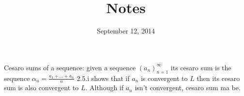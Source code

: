 \documentclass[letterpaper]{article}
\begin{document}
\title{Notes}
\date{September 12, 2014}
\maketitle
Cesaro sums of a sequence: given a sequence $(a_n)_{n=1}^\infty$ its cesaro sum is the sequence $\alpha_n=\frac{a_1+\dots+a_n}{n}$ 2.5.i shows that if $a_n$ is convergent to $L$ then its cesaro sum is also convergent to $L$. Although if $a_n$ isn't convergent, cesaro sum ma be.
\end{document}
